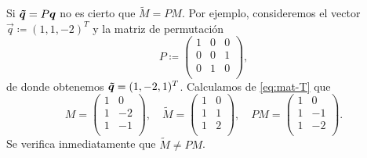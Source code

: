 \begin{observation}
	Si $\boldsymbol{\tilde{q}} = P\boldsymbol{q}$ no es cierto que $\tilde{M} = PM$. Por ejemplo, consideremos el vector
	$\vec{q} \coloneq (1, 1, -2)^T$ y la matriz de permutación
	\begin{equation*}
		P \coloneq \begin{pmatrix}
			1 & 0 & 0 \\
			0 & 0 & 1 \\
			0 & 1 & 0 \\
		\end{pmatrix},
	\end{equation*}
	de donde obtenemos $\boldsymbol{\tilde{q}} = (1, -2, 1)^T$. Calculamos de \eqref{eq:mat-T} que
	\begin{equation*}
		M = \begin{pmatrix}
			1 & 0 \\
			1 & -2 \\
			1 & -1 \\
		\end{pmatrix}, \quad
		\tilde{M} = \begin{pmatrix}
			1 & 0 \\
			1 & 1 \\
			1 & 2 \\
		\end{pmatrix}, \quad
		PM = \begin{pmatrix}
			1 & 0 \\
			1 & -1 \\
			1 & -2 \\
		\end{pmatrix}.
	\end{equation*}
	Se verifica inmediatamente que $\tilde{M} \neq PM$.
\end{observation}

